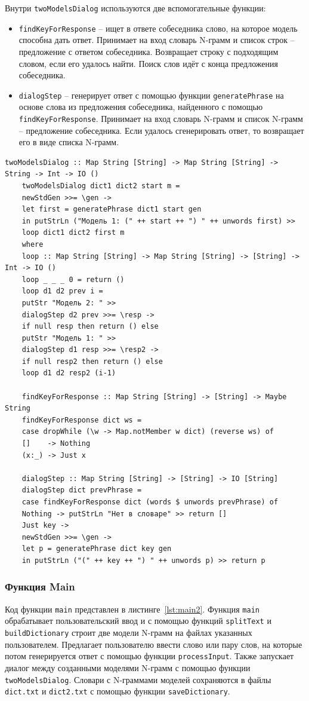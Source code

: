 \documentclass[a4paper, final]{article}
\begin{document}
Внутри \texttt{twoModelsDialog} используются две вспомогательные функции:

\begin{itemize}
	\item \texttt{findKeyForResponse} -- ищет в ответе собеседника слово, на которое модель способна дать ответ. Принимает на вход словарь N-грамм и список строк -- предложение с ответом собеседника. Возвращает строку с подходящим словом, если его удалось найти. Поиск слов идёт с конца предложения собеседника.
	\item \texttt{dialogStep} -- генерирует ответ с помощью функции \texttt{generatePhrase} на основе слова из предложения собеседника, найденного с помощью \texttt{findKeyForResponse}. Принимает на вход словарь N-грамм и список N-грамм -- предложение собеседника. Если удалось сгенерировать ответ, то возвращает его в виде списка N-грамм. 
\end{itemize}

\begin{lstlisting}[caption={Функция twoModelsDialog для организации диалога между двумя моделями}, label={lst:twoModelsDialog}]
	twoModelsDialog :: Map String [String] -> Map String [String] -> String -> Int -> IO ()
	twoModelsDialog dict1 dict2 start m =
	newStdGen >>= \gen ->
	let first = generatePhrase dict1 start gen
	in putStrLn ("Модель 1: (" ++ start ++ ") " ++ unwords first) >>
	loop dict1 dict2 first m
	where
	loop :: Map String [String] -> Map String [String] -> [String] -> Int -> IO ()
	loop _ _ _ 0 = return ()
	loop d1 d2 prev i =
	putStr "Модель 2: " >>
	dialogStep d2 prev >>= \resp ->
	if null resp then return () else
	putStr "Модель 1: " >>
	dialogStep d1 resp >>= \resp2 ->
	if null resp2 then return () else
	loop d1 d2 resp2 (i-1)
	
	findKeyForResponse :: Map String [String] -> [String] -> Maybe String
	findKeyForResponse dict ws =
	case dropWhile (\w -> Map.notMember w dict) (reverse ws) of
	[]    -> Nothing
	(x:_) -> Just x
	
	dialogStep :: Map String [String] -> [String] -> IO [String]
	dialogStep dict prevPhrase =
	case findKeyForResponse dict (words $ unwords prevPhrase) of
	Nothing -> putStrLn "Нет в словаре" >> return []
	Just key ->
	newStdGen >>= \gen ->
	let p = generatePhrase dict key gen
	in putStrLn ("(" ++ key ++ ") " ++ unwords p) >> return p
\end{lstlisting}

\subsubsection{Функция Main}
Код функции \texttt{main} представлен в листинге~\ref{lst:main2}.  
Функция \texttt{main} обрабатывает пользовательский ввод и с помощью функций \texttt{splitText} и \texttt{buildDictionary} строит две модели N-грамм на файлах указанных пользователем. Предлагает пользователю ввести слово или пару слов, на которые потом генерируется ответ с помощью функции \texttt{processInput}. Также запускает диалог между созданными моделями N-грамм с помощью функции \texttt{twoModelsDialog}. Словари с N-граммами моделей сохраняются в файлы \texttt{dict.txt} и \texttt{dict2.txt} с помощью функции \texttt{saveDictionary}.
\end{document}
